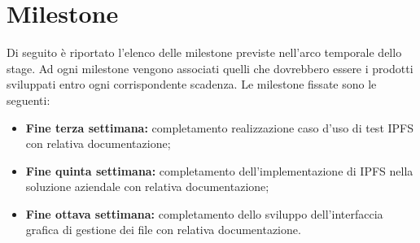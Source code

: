 
\section*{Milestone}
Di seguito è riportato l’elenco delle milestone previste nell’arco temporale dello stage. Ad ogni milestone vengono
associati quelli che dovrebbero essere i prodotti sviluppati entro ogni corrispondente scadenza. Le milestone
fissate sono le seguenti:

\begin{itemize}
\item \textbf{Fine terza settimana:} completamento realizzazione caso d’uso di test IPFS con relativa documentazione;
\item \textbf{Fine quinta settimana:} completamento dell’implementazione di IPFS nella soluzione aziendale con relativa documentazione;
\item \textbf{Fine ottava settimana:}  completamento dello sviluppo dell’interfaccia grafica di gestione dei file con relativa documentazione.
\end{itemize}